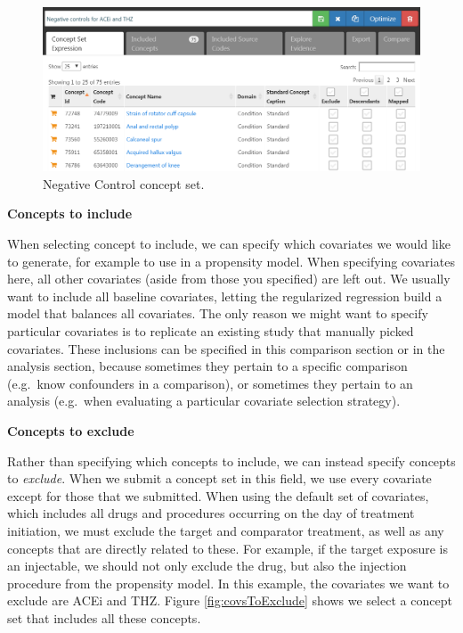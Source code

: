 \documentclass[]{book}
\begin{document}
\begin{figure}

{\centering \includegraphics[width=1\linewidth]{images/PopulationLevelEstimation/ncConceptSet} 

}

\caption{Negative Control concept set.}\label{fig:ncConceptSet}
\end{figure}

\textbf{Concepts to include}

When selecting concept to include, we can specify which covariates we would like to generate, for example to use in a propensity model. When specifying covariates here, all other covariates (aside from those you specified) are left out. We usually want to include all baseline covariates, letting the regularized regression build a model that balances all covariates. The only reason we might want to specify particular covariates is to replicate an existing study that manually picked covariates. These inclusions can be specified in this comparison section or in the analysis section, because sometimes they pertain to a specific comparison (e.g.~know confounders in a comparison), or sometimes they pertain to an analysis (e.g.~when evaluating a particular covariate selection strategy).

\textbf{Concepts to exclude}

Rather than specifying which concepts to include, we can instead specify concepts to \emph{exclude}. When we submit a concept set in this field, we use every covariate except for those that we submitted. When using the default set of covariates, which includes all drugs and procedures occurring on the day of treatment initiation, we must exclude the target and comparator treatment, as well as any concepts that are directly related to these. For example, if the target exposure is an injectable, we should not only exclude the drug, but also the injection procedure from the propensity model. In this example, the covariates we want to exclude are ACEi and THZ. Figure \ref{fig:covsToExclude} shows we select a concept set that includes all these concepts.
\end{document}
